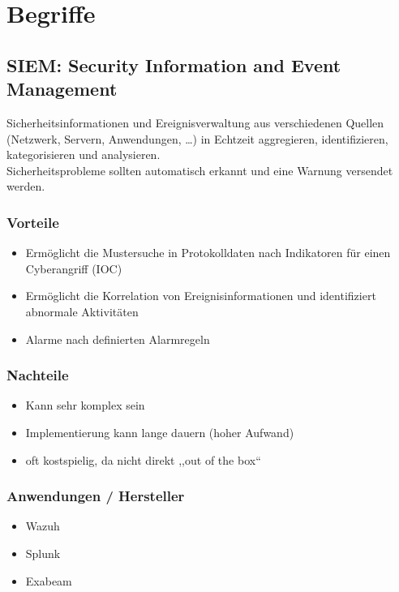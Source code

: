 

\section{Begriffe}\label{sec:Begriffe}

\subsection{SIEM: Security Information and Event Management}\label{subsec:siem}
Sicherheitsinformationen und Ereignisverwaltung aus verschiedenen Quellen (Netzwerk, Servern, Anwendungen, \ldots) in Echtzeit aggregieren, identifizieren, kategorisieren und analysieren.\\
Sicherheitsprobleme sollten automatisch erkannt und eine Warnung versendet werden.
\subsubsection{Vorteile}
\begin{itemize}
    \item Ermöglicht die Mustersuche in Protokolldaten nach Indikatoren für einen Cyberangriff (IOC)
    \item Ermöglicht die Korrelation von Ereignisinformationen und identifiziert abnormale Aktivitäten
    \item Alarme nach definierten Alarmregeln
\end{itemize}

\subsubsection{Nachteile}
\begin{itemize}
    \item Kann sehr komplex sein
    \item Implementierung kann lange dauern (hoher Aufwand)
    \item oft kostspielig, da nicht direkt ,,out of the box``
\end{itemize}

\subsubsection{Anwendungen / Hersteller}
\begin{itemize}
    \item Wazuh
    \item Splunk
    \item Exabeam
\end{itemize}


